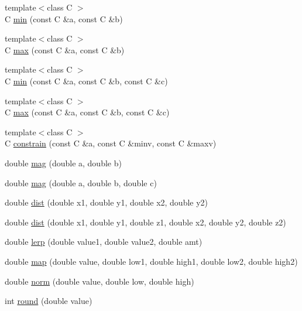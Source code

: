 \begin{DoxyCompactItemize}
\item 
{\footnotesize template$<$class C $>$ }\\\-C \hyperlink{namespacecprocessing_af95e692d22ac15bcca2320380e5835fe}{min} (const \-C \&a, const \-C \&b)
\item 
{\footnotesize template$<$class C $>$ }\\\-C \hyperlink{namespacecprocessing_ab4e75c25cbada0bb5a001658f44783e6}{max} (const \-C \&a, const \-C \&b)
\item 
{\footnotesize template$<$class C $>$ }\\\-C \hyperlink{namespacecprocessing_a8a241f2fab0a037ec7891f47c72a7b27}{min} (const \-C \&a, const \-C \&b, const \-C \&c)
\item 
{\footnotesize template$<$class C $>$ }\\\-C \hyperlink{namespacecprocessing_a6739cf85267bc8298c5fc87ad9a17c4e}{max} (const \-C \&a, const \-C \&b, const \-C \&c)
\item 
{\footnotesize template$<$class C $>$ }\\\-C \hyperlink{namespacecprocessing_a5f001d15dc5d3457f6d9b88c7eca54a9}{constrain} (const \-C \&a, const \-C \&minv, const \-C \&maxv)
\item 
double \hyperlink{namespacecprocessing_a2eebc33d41a8e243dd4f5bda43af75d5}{mag} (double a, double b)
\item 
double \hyperlink{namespacecprocessing_a2ac0d97a2d0825c780ccf9d178ea2904}{mag} (double a, double b, double c)
\item 
double \hyperlink{namespacecprocessing_aeae31092ccf4a4dc2553154be0945603}{dist} (double x1, double y1, double x2, double y2)
\item 
double \hyperlink{namespacecprocessing_a556b7ccc46527e951c0a0cf12f285fd1}{dist} (double x1, double y1, double z1, double x2, double y2, double z2)
\item 
double \hyperlink{namespacecprocessing_ad3e9bb8446fe8c867e5e90b33a451115}{lerp} (double value1, double value2, double amt)
\item 
double \hyperlink{namespacecprocessing_aff1e390b22ff2059099c0b9eadf05a51}{map} (double value, double low1, double high1, double low2, double high2)
\item 
double \hyperlink{namespacecprocessing_a9e4b103e9613fa8c7b6935fd68f59cdf}{norm} (double value, double low, double high)
\item 
int \hyperlink{namespacecprocessing_a37d82dab509470561df4e8ac40bdce71}{round} (double value)
\item 

\end{DoxyCompactItemize}
